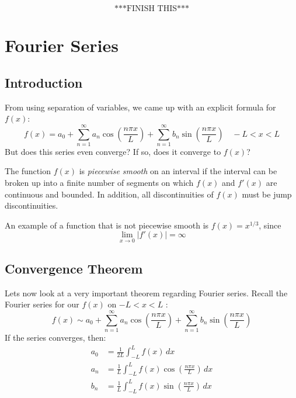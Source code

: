 \documentclass{article}
\begin{document}
	\[ \text{***FINISH THIS***} \]
	
	
	
	\section{Fourier Series}
	
	\subsection{Introduction}
	
	From using separation of variables, we came up with an explicit formula for $ f(x) $:
	\[
		f(x) = a_0 + \sum\limits_{n=1}^{\infty} a_n \cos\left( \frac{n\pi x}{L} \right) + \sum\limits_{n=1}^{\infty} b_n \sin\left( \frac{n\pi x}{L} \right) \quad -L < x < L
	\]
	But does this series even converge? If so, does it converge to $ f(x) $?
	
	\begin{define}
		The function $ f(x) $ is \textit{piecewise smooth} on an interval if the interval can be broken up into a finite number of segments on which $ f(x) $ and $ f'(x) $ are continuous and bounded. In addition, all discontinuities of $ f(x) $ must be jump discontinuities.
	\end{define}
	
	\begin{center}
		 \hspace{3mm}
	\end{center}
	
	An example of a function that is not piecewise smooth is $ f(x) = x^{1/3} $, since 
	\[
		\lim\limits_{x \to 0} |f'(x)| = \infty 
	\]
	
	
	\subsection{Convergence Theorem}
	
	Lets now look at a very important theorem regarding Fourier series. Recall the Fourier series for our $ f(x) $ on $ -L < x < L $ :
	\begin{equation}\label{fourier}
		f(x) \sim a_0 + \sum\limits_{n=1}^{\infty} a_n \cos\left( \frac{n\pi x}{L} \right) + \sum\limits_{n=1}^{\infty} b_n \sin\left( \frac{n\pi x}{L} \right)
	\end{equation}
	If the series converges, then:
	\begin{align*}
		a_0 &= \frac{1}{2L} \int_{-L}^{L} f(x) \, dx \\
		a_n &= \frac{1}{L} \int_{-L}^{L} f(x) \cos\left( \frac{n\pi x}{L} \right) \, dx \\
		b_n &= \frac{1}{L} \int_{-L}^{L} f(x) \sin\left( \frac{n\pi x}{L} \right) \, dx
	\end{align*}
	
\end{document}
